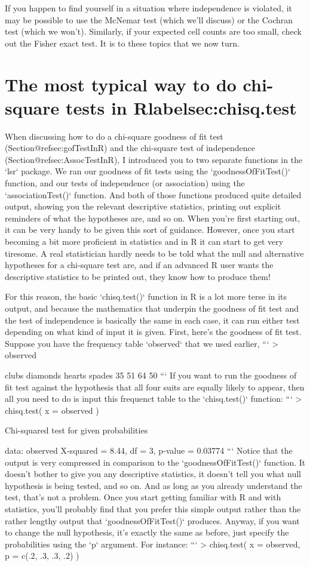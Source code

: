 If you happen to find yourself in a situation where independence is violated, it may be possible to use the McNemar test (which we'll discuss) or the Cochran test (which we won't). Similarly, if your expected cell counts are too small, check out the Fisher exact test. It is to these topics that we now turn. 

\section{The most typical way to do chi-square tests in Rlabel{sec:chisq.test}}

When discussing how to do a chi-square goodness of fit test (Section@refsec:gofTestInR) and the chi-square test of independence (Section@refsec:AssocTestInR), I introduced you to two separate functions in the `lsr` package. We ran our goodness of fit tests using the `goodnessOfFitTest()` function, and our tests of independence (or association) using the `associationTest()` function. And both of those functions produced quite detailed output, showing you the relevant descriptive statistics, printing out explicit reminders of what the hypotheses are, and so on. When you're first starting out, it can be very handy to be given this sort of guidance. However, once you start becoming a bit more proficient in statistics and in R it can start to get very tiresome. A real statistician hardly needs to be told what the null and alternative hypotheses for a chi-square test are, and if an advanced R user wants the descriptive statistics to be printed out, they know how to produce them! 

For this reason, the basic `chisq.test()` function in R is a lot more terse in its output, and because the mathematics that underpin the goodness of fit test and the test of independence is basically the same in each case, it can run either test depending on what kind of input it is given. First, here's the goodness of fit test. Suppose you have the frequency table `observed` that we used earlier,
```
> observed

   clubs diamonds   hearts   spades 
      35       51       64       50 
```
If you want to run the goodness of fit test against the hypothesis that all four suits are equally likely to appear, then all you need to do is input this frequenct table to the `chisq.test()` function:
```
> chisq.test( x = observed )

	Chi-squared test for given probabilities

data:  observed
X-squared = 8.44, df = 3, p-value = 0.03774
```
Notice that the output is very compressed in comparison to the `goodnessOfFitTest()` function. It doesn't bother to give you any descriptive statistics, it doesn't tell you what null hypothesis is being tested, and so on. And as long as you already understand the test, that's not a problem. Once you start getting familiar with R and with statistics, you'll probably find that you prefer this simple output rather than the rather lengthy output that  `goodnessOfFitTest()` produces. Anyway, if you want to change the null hypothesis, it's exactly the same as before, just specify the probabilities using the `p` argument. For instance:
```
> chisq.test( x = observed, p = c(.2, .3, .3, .2) )

